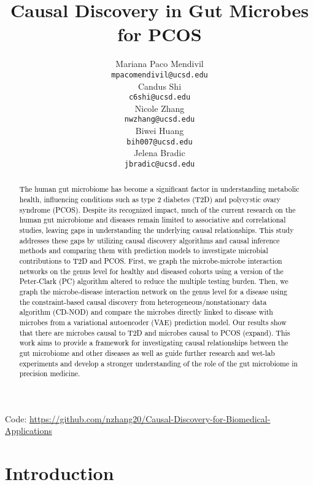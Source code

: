 \documentclass[12pt,letterpaper]{article}
\title{Causal Discovery in Gut Microbes for PCOS}
\author{Mariana Paco Mendivil \\
  {\tt mpacomendivil@ucsd.edu} \\\And
  Candus Shi \\
  {\tt c6shi@ucsd.edu} \\\And
  Nicole Zhang \\
  {\tt nwzhang@ucsd.edu} \\\And
  Biwei Huang \\
  {\tt bih007@ucsd.edu} \\\And
  Jelena Bradic \\
  {\tt jbradic@ucsd.edu}}
\begin{document}
\maketitle



\begin{abstract}
    \textcolor{black}{
    The human gut microbiome has become a significant factor in understanding metabolic health, influencing conditions such as type 2 diabetes (T2D) and polycystic ovary syndrome (PCOS). Despite its recognized impact, much of the current research on the human gut microbiome and diseases remain limited to associative and correlational studies, leaving gaps in understanding the underlying causal relationships. This study addresses these gaps by utilizing causal discovery algorithms and causal inference methods and comparing them with prediction models to investigate microbial contributions to T2D and PCOS. First, we graph the microbe-microbe interaction networks on the genus level for healthy and diseased cohorts using a version of the Peter-Clark (PC) algorithm altered to reduce the multiple testing burden. Then, we graph the microbe-disease interaction network on the genus level for a disease using the constraint-based causal discovery from heterogeneous/nonstationary data algorithm (CD-NOD) and compare the microbes directly linked to disease with microbes from a variational autoencoder (VAE) prediction model. Our results show that there are microbes causal to T2D and microbes causal to PCOS (expand). This work aims to provide a framework for investigating causal relationships between the gut microbiome and other diseases as well as guide further research and wet-lab experiments and develop a stronger understanding of the role of the gut microbiome in precision medicine.}
\end{abstract}

\begin{center}

Code: \url{https://github.com/nzhang20/Causal-Discovery-for-Biomedical-Applications}
\end{center}

\maketoc
\clearpage


\section{Introduction}
\end{document}
